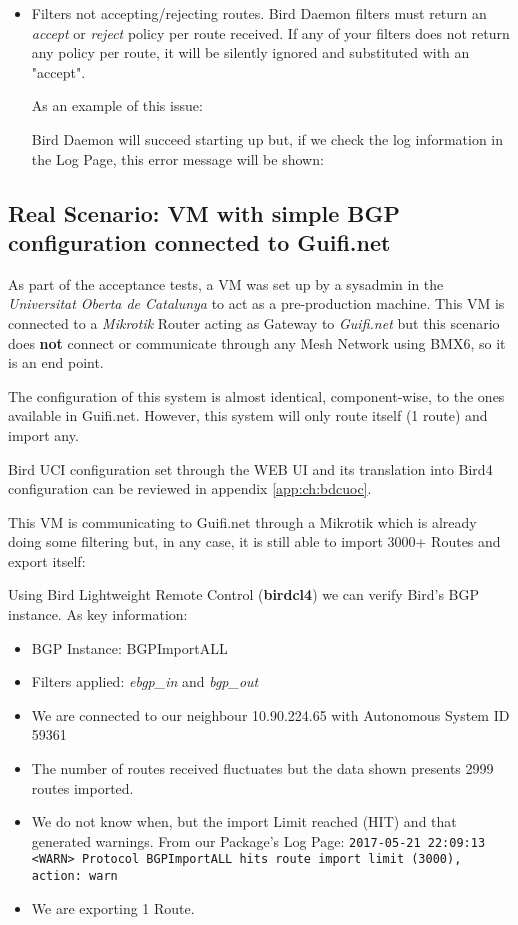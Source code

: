 \begin{itemize}
\item Filters not accepting/rejecting routes.
Bird Daemon filters must return an \textit{accept} or \textit{reject} policy per route received. If any of your filters does not return any policy per route, it will be silently ignored and substituted with an "accept".

As an example of this issue:


Bird Daemon will succeed starting up but, if we check the log information in the Log Page, this error message will be shown:


\end{itemize}

\subsection{Real Scenario: VM with simple BGP configuration connected to Guifi.net}
As part of the acceptance tests, a VM was set up by a sysadmin in the \textit{Universitat Oberta de Catalunya} to act as a pre-production machine. This VM is connected to a \textit{Mikrotik} Router acting as Gateway to \textit{Guifi.net} but this scenario does \textbf{not} connect or communicate through any Mesh Network using BMX6, so it is an end point.

The configuration of this system is almost identical, component-wise, to the ones available in Guifi.net. However, this system will only route itself (1 route) and import any.

Bird UCI configuration set through the WEB UI and its translation into Bird4 configuration can be reviewed in appendix \ref{app:ch:bdcuoc}.

This VM is communicating to Guifi.net through a Mikrotik which is already doing some filtering but, in any case, it is still able to import 3000+ Routes and export itself:



Using Bird Lightweight Remote Control (\textbf{birdcl4}) we can verify Bird's BGP instance. As key information:

\begin{itemize}
    \item BGP Instance: BGPImportALL
    \item Filters applied: \textit{ebgp\_in} and \textit{bgp\_out}
    \item We are connected to our neighbour 10.90.224.65 with Autonomous System ID 59361
    \item  The number of routes received fluctuates but the data shown presents 2999 routes imported.
    \item We do not know when, but the import Limit reached (HIT) and that generated warnings.
    From our Package's Log Page:
    \texttt{2017-05-21 22:09:13 <WARN> Protocol BGPImportALL hits route import limit (3000), action: warn}
    \item We are exporting 1 Route.
\end{itemize}

